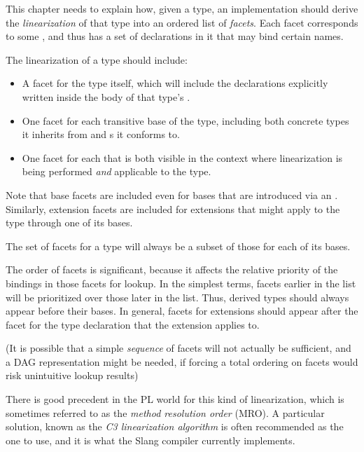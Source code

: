 
\begin{TODO}

This chapter needs to explain how, given a type, an implementation should derive the \emph{linearization} of that type into an ordered list of \emph{facets}.
Each facet corresponds to some , and thus has a set of declarations in it that may bind certain names.

The linearization of a type should include:

\begin{itemize}
\item A facet for the type itself, which will include the declarations explicitly written inside the body of that type's .

\item One facet for each transitive base of the type, including both concrete types it inherits from and s it conforms to.

\item One facet for each  that is both visible in the context where linearization is being performed \emph{and} applicable to the type.
\end{itemize}

Note that base facets are included even for bases that are introduced via an .
Similarly, extension facets are included for extensions that might apply to the type through one of its bases.

The set of facets for a type will always be a subset of those for each of its bases.

The order of facets is significant, because it affects the relative priority of the bindings in those facets for lookup.
In the simplest terms, facets earlier in the list will be prioritized over those later in the list.
Thus, derived types should always appear before their bases.
In general, facets for extensions should appear after the facet for the type declaration that the extension applies to.

(It is possible that a simple \emph{sequence} of facets will not actually be sufficient, and a DAG representation might be needed, if forcing a total ordering on facets would risk unintuitive lookup results)

There is good precedent in the PL world for this kind of linearization, which is sometimes referred to as the \emph{method resolution order} (MRO).
A particular solution, known as the \emph{C3 linearization algorithm} is often recommended as the one to use, and it is what the Slang compiler currently implements.
\end{TODO}